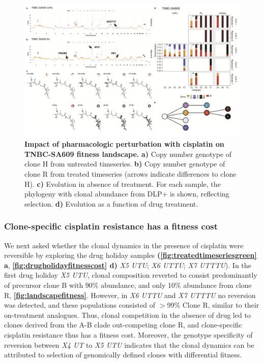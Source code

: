 \begin{figure}
\centering
\includegraphics[width=\textwidth]{Figures/chap4/genePlotSA609.png}
	
\caption[Impact of pharmacologic perturbation with cisplatin on TNBC-SA609 fitness landscape]
	{\small
	\textbf{Impact of pharmacologic perturbation with cisplatin on TNBC-SA609 fitness landscape.}
	 \textbf{a)} Copy number genotype of clone H from untreated timeseries. \textbf{b)} Copy number genotype of clone R from treated timeseries (arrows indicate differences to clone H). \textbf{c)}  Evolution in absence of treatment. For each sample, the phylogeny with clonal abundance from DLP+ is shown, reflecting selection. \textbf{d)} Evolution as a function of drug treatment.}
\label{fig:genotype609}
\end{figure}




\subsubsection {Clone-specific cisplatin resistance has a fitness cost}
We next asked whether the clonal dynamics in the presence of cisplatin were reversible by exploring the drug holiday samples \textbf{(\autoref{fig:treatedtimeseriesgreen} a}, \textbf{\autoref{fig:drugholidayfitnesscost} d)} \textit{X5 UTU}; \textit{X6 UTTU}; \textit{X7 UTTTU}). In the first drug holiday \textit{X5 UTU}, clonal composition reverted to consist predominantly of precursor clone B with 90\% abundance, and only 10\% abundance from clone R, \textbf{\autoref{fig:landscapefitness}}.  However, in \textit{X6 UTTU} and \textit{X7 UTTTU} no reversion was detected, and these populations consisted of  $>$99\% Clone R, similar to their on-treatment analogues. Thus, clonal competition in the absence of drug led to clones derived from the A-B clade out-competing clone R, and clone-specific cisplatin resistance thus has a fitness cost. Moreover, the genotype specificity of reversion between \textit{X4 UT} to \textit{X5 UTU} indicates that the clonal dynamics can be attributed to selection of genomically defined clones with differential fitness. 


